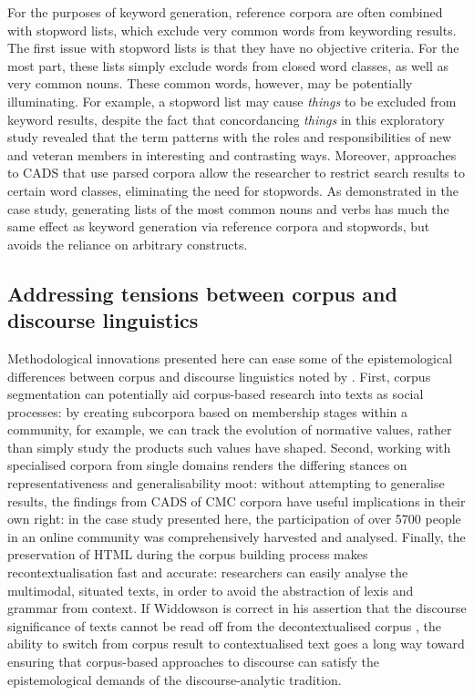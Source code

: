For the purposes of keyword generation, reference corpora are often combined with stopword lists, which exclude very common words from keywording results. The first issue with stopword lists is that they have no objective criteria. For the most part, these lists simply exclude words from closed word classes, as well as very common nouns. These common words, however, may be potentially illuminating. For example, a stopword list may cause \emph{things} to be excluded from keyword results, despite the fact that concordancing \emph{things} in this exploratory study revealed that the term patterns with the roles and responsibilities of new and veteran members in interesting and contrasting ways. Moreover, approaches to \gls{CADS} that use parsed corpora allow the researcher to restrict search results to certain word classes, eliminating the need for stopwords. As demonstrated in the case study, generating lists of the most common nouns and verbs has much the same effect as keyword generation via reference corpora and stopwords, but avoids the reliance on arbitrary constructs.

\subsection{Addressing tensions between corpus and discourse linguistics} \label{sect:discusstensions}

Methodological innovations presented here can ease some of the epistemological differences between corpus and discourse linguistics noted by \textcite{virtanen_discourse_2009}. First, corpus segmentation can potentially aid corpus-based research into texts as social processes: by creating subcorpora based on membership stages within a community, for example, we can track the evolution of normative values, rather than simply study the products such values have shaped. Second, working with specialised corpora from single domains renders the differing stances on representativeness and generalisability moot: without attempting to generalise results, the findings from \gls{CADS} of \gls{CMC} corpora have useful implications in their own right: in the case study presented here, the participation of over 5700 people in an online community was comprehensively harvested and analysed. Finally, the preservation of HTML during the corpus building process makes recontextualisation fast and accurate: researchers can easily analyse the multimodal, situated texts, in order to avoid the abstraction of lexis and grammar from context. If Widdowson is correct in his assertion that the discourse significance of texts cannot be read off from the decontextualised corpus \citeyear[p.~9]{widdowson_limitations_2000}, the ability to switch from corpus result to contextualised text goes a long way toward ensuring that corpus-based approaches to discourse can satisfy the epistemological demands of the discourse-analytic tradition.


